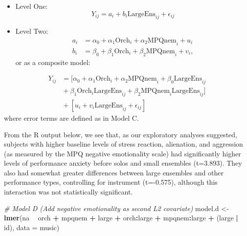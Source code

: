 \documentclass[
]{krantz}
\newenvironment{Shaded}{\begin{snugshade}}{\end{snugshade}}
\newcommand{\CommentTok}[1]{\textcolor[rgb]{0.37,0.37,0.37}{\textit{#1}}}
\newcommand{\DataTypeTok}[1]{\textcolor[rgb]{0.27,0.27,0.27}{#1}}
\newcommand{\KeywordTok}[1]{\textcolor[rgb]{0.27,0.27,0.27}{\textbf{#1}}}
\newcommand{\NormalTok}[1]{#1}
\newcommand{\OperatorTok}[1]{\textcolor[rgb]{0.43,0.43,0.43}{\textbf{#1}}}
\newcommand{\StringTok}[1]{\textcolor[rgb]{0.5,0.5,0.5}{#1}}
\begin{document}
\begin{itemize}
\item
  Level One:
  \begin{equation*}
  Y_{ij} = a_{i}+b_{i}\textrm{LargeEns}_{ij}+\epsilon_{ij}
  \end{equation*}
\item
  Level Two:
  \begin{align*}
  a_{i} & = \alpha_{0}+\alpha_{1}\textrm{Orch}_{i}+\alpha_{2}\textrm{MPQnem}_{i}+u_{i} \\
  b_{i} & = \beta_{0}+\beta_{1}\textrm{Orch}_{i}+\beta_{2}\textrm{MPQnem}_{i}+v_{i},
  \end{align*}
  or as a composite model:
\end{itemize}

\begin{align*}
Y_{ij} & = [\alpha_{0}+\alpha_{1}\textrm{Orch}_{i}+\alpha_{2}\textrm{MPQnem}_{i}+\beta_{0}\textrm{LargeEns}_{ij} \\
 & \textrm{} + \beta_{1}\textrm{Orch}_{i}\textrm{LargeEns}_{ij}+\beta_{2}\textrm{MPQnem}_{i}\textrm{LargeEns}_{ij}] \\
 & \textrm{} + [u_{i}+v_{i}\textrm{LargeEns}_{ij}+\epsilon_{ij}]
\end{align*}
where error terms are defined as in Model C.

From the R output below, we see that, as our exploratory analyses suggested, subjects with higher baseline levels of stress reaction, alienation, and aggression (as measured by the MPQ negative emotionality scale) had significantly higher levels of performance anxiety before solos and small ensembles (t=3.893). They also had somewhat greater differences between large ensembles and other performance types, controlling for instrument (t=-0.575), although this interaction was not statistically significant.

\begin{Shaded}
\begin{Highlighting}[]
\CommentTok{# Model D (Add negative emotionality as second L2 covariate)}
\NormalTok{model.d <-}\StringTok{ }\KeywordTok{lmer}\NormalTok{(na }\OperatorTok{~}\StringTok{ }\NormalTok{orch }\OperatorTok{+}\StringTok{ }\NormalTok{mpqnem }\OperatorTok{+}\StringTok{ }\NormalTok{large }\OperatorTok{+}\StringTok{ }\NormalTok{orch}\OperatorTok{:}\NormalTok{large }\OperatorTok{+}\StringTok{ }
\StringTok{  }\NormalTok{mpqnem}\OperatorTok{:}\NormalTok{large }\OperatorTok{+}\StringTok{ }\NormalTok{(large }\OperatorTok{|}\StringTok{ }\NormalTok{id), }\DataTypeTok{data =}\NormalTok{ music)}
\end{Highlighting}
\end{Shaded}
\end{document}
